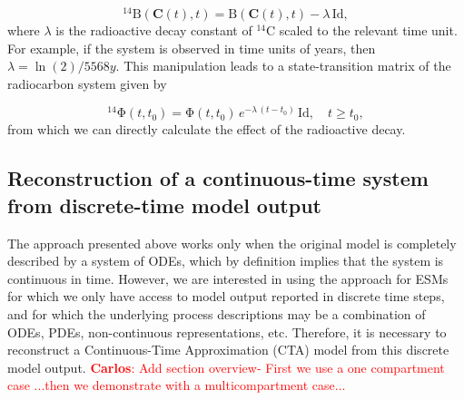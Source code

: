 \documentclass[11pt,a4paper]{article}
\newcommand{\red}[1]{\textcolor{red}{#1}}
\renewcommand{\vec}[1]{\mathbf{#1}}
\newcommand{\tens}[1]{\mathrm{#1}}
\newcommand{\id}{\tens{Id}}
\begin{document}
    \begin{equation*}
        {}^{14}\tens{B}(\vec{C}(t),t) = \tens{B}(\vec{C}(t),t) - \lambda\,\id,
    \end{equation*}
    where $\lambda$ is the radioactive decay constant of ${}^{14}$C scaled to the relevant time unit.
    For example, if the system is observed in time units of years, then $\lambda=\ln(2)/5568 y$.
    This manipulation leads to a state-transition matrix of the radiocarbon system given by
    
    \begin{equation*}
        {}^{14}\tens{\Phi}(t,t_0) = \tens{\Phi}(t,t_0)\, e^{-\lambda\,(t-t_0)}\,\id, \quad t\geq t_0,
    \end{equation*}
    from which we can directly calculate the effect of the radioactive decay.


\subsection{Reconstruction of a continuous-time system from discrete-time model output}
The approach presented above works only when the original model is completely described by a system of ODEs, which by definition implies that the system is continuous in time. However, we are interested in using the approach for ESMs for which we only have access to model output reported in discrete time steps, and for which the underlying process descriptions may be a combination of ODEs, PDEs, non-continuous representations, etc. Therefore, it is necessary to reconstruct a Continuous-Time Approximation (CTA) model from this discrete model output. \red{\textbf{Carlos}: Add section overview- First we use a one compartment case ...then we demonstrate with a multicompartment case...} 
    
\end{document}
